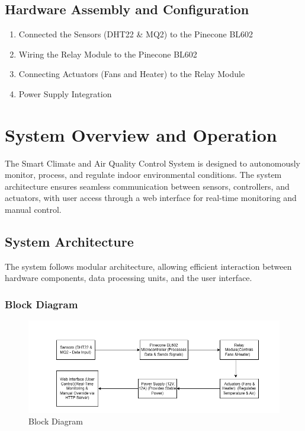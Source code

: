 \documentclass[a4paper]{scrartcl}
\begin{document}
\subsection{Hardware Assembly and Configuration}
\begin{enumerate}
    \item {Connected the Sensors (DHT22 \& MQ2) to the Pinecone BL602}
    \item {Wiring the Relay Module to the Pinecone BL602}
    \item {Connecting Actuators (Fans and Heater) to the Relay Module}
    \item {Power Supply Integration}
\end{enumerate}

\section{System Overview and Operation}
The Smart Climate and Air Quality Control System is designed to autonomously monitor, process, and regulate indoor environmental conditions. The system architecture ensures seamless communication between sensors, controllers, and actuators, with user access through a web interface for real-time monitoring and manual control.

\subsection{System Architecture}
The system follows modular architecture, allowing efficient interaction between hardware components, data processing units, and the user interface.

\subsubsection{Block Diagram}
\begin{figure}[H]
    \centering
    \includegraphics[width=1\textwidth]{images/BD.png}
    \caption{Block Diagram}
\end{figure}
\end{document}
